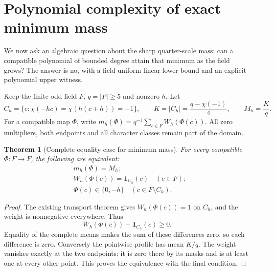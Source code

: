 \documentclass[11pt]{article}
\newtheorem{theorem}{Theorem}[section]
\begin{document}
\section{Polynomial complexity of exact minimum mass}
\label{sec:optimal-transport-degree}
We now ask an algebraic question about the sharp quarter-scale mass:
can a compatible polynomial of bounded degree attain that minimum
as the field grows? The answer is no, with a field-uniform linear
lower bound and an explicit polynomial upper witness.

Keep the finite odd field \(F\), \(q=|F|\ge5\) and nonzero \(h\).
Let
\[
 C_h=\{c:\chi(-hc)=\chi(h(c+h))=-1\},\qquad
 K=|C_h|=\frac{q-\chi(-1)}4,\qquad
 M_h=\frac Kq.
\]
For a compatible map \(\Phi\), write
\(m_h(\Phi)=q^{-1}\sum_{c\in F}W_h(\Phi(c))\).
All zero multipliers, both endpoints and all character classes
remain part of the domain.

\begin{theorem}[Complete equality case for minimum mass]
\label{thm:minimum-transport-profile}
For every compatible \(\Phi:F\to F\), the following are equivalent:
\[
 \begin{split}
 &m_h(\Phi)=M_h;\\
 &W_h(\Phi(c))=\mathbf1_{C_h}(c)\quad(c\in F);\\
 &\Phi(c)\in\{0,-h\}\quad(c\in F\setminus C_h).
 \end{split}                                             \tag{DG1}
\]
\end{theorem}
\begin{proof}
The existing transport theorem gives
\(W_h(\Phi(c))=1\) on \(C_h\), and the weight is nonnegative
everywhere. Thus
\[
 W_h(\Phi(c))-\mathbf1_{C_h}(c)\ge0.
\]
Equality of the complete means makes the sum of these differences
zero, so each difference is zero. Conversely the pointwise profile
has mean \(K/q\).
The weight vanishes exactly at the two endpoints: it is zero
there by its masks and is at least one at every other point.
This proves the equivalence with the final condition.
\end{proof}
\end{document}
